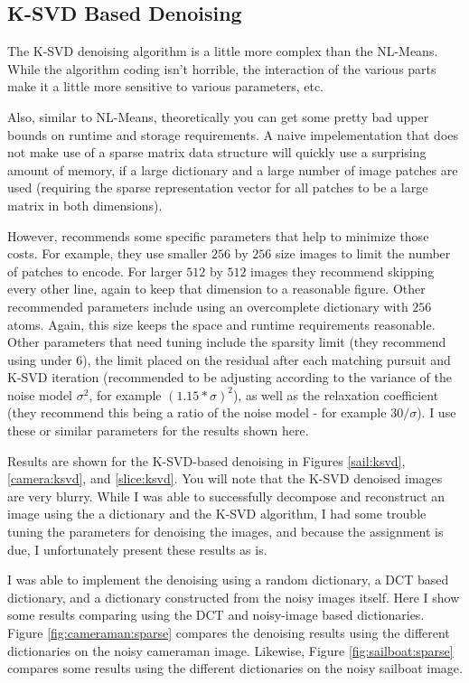 \documentclass[11pt]{article}
\begin{document}
\subsection{K-SVD Based Denoising}

The K-SVD denoising algorithm is a little more complex than the NL-Means.
While the algorithm coding isn't horrible, the interaction of the various parts make it a little more sensitive to various parameters, etc.

Also, similar to NL-Means, theoretically you can get some pretty bad upper bounds on runtime and storage requirements.
A naive impelementation that does not make use of a sparse matrix data structure will quickly use a surprising amount of memory, if a large dictionary and a large number of image patches are used (requiring the sparse representation vector for all patches to be a large matrix in both dimensions).

However, \cite{elad2006image} recommends some specific parameters that help to minimize those costs.
For example, they use smaller $256$ by $256$ size images to limit the number of patches to encode.
For larger $512$ by $512$ images they recommend skipping every other line, again to keep that dimension to a reasonable figure.
Other recommended parameters include using an overcomplete dictionary with $256$ atoms.
Again, this size keeps the space and runtime requirements reasonable.
Other parameters that need tuning include the sparsity limit (they recommend using under $6$), the limit placed on the residual after each matching pursuit and K-SVD iteration (recommended to be adjusting according to the variance of the noise model $\sigma^2$, for example $(1.15*\sigma)^2$), as well as the relaxation coefficient (they recommend this being a ratio of the noise model - for example $30/\sigma$).
I use these or similar parameters for the results shown here.

Results are shown for the K-SVD-based denoising in Figures \ref{sail:ksvd},\ref{camera:ksvd}, and \ref{slice:ksvd}.
You will note that the K-SVD denoised images are very blurry.
While I was able to successfully decompose and reconstruct an image using the a dictionary and the K-SVD algorithm, I had some trouble tuning the parameters for denoising the images, and because the assignment is due, I unfortunately present these results as is.

I was able to implement the denoising using a random dictionary, a DCT based dictionary, and a dictionary constructed from the noisy images itself.
Here I show some results comparing using the DCT and noisy-image based dictionaries.
Figure \ref{fig:cameraman:sparse} compares the denoising results using the different dictionaries on the noisy cameraman image.
Likewise, Figure \ref{fig:sailboat:sparse} compares some results using the different dictionaries on the noisy sailboat image.
\end{document}
